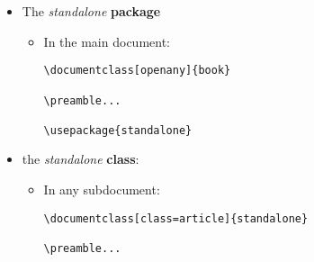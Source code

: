 \documentclass[class=article , crop=false, titlepage, twoside, multi={itemize, figure, verbatim}, float=false]{standalone}
\begin{document}
\begin{itemize}
\item The \emph{standalone} \textbf{package}

\begin{itemize}
\item In the main document:
\begin{verbatim}
\documentclass[openany]{book}

\preamble...

\usepackage{standalone}
\end{verbatim}

\end{itemize}

\item the \emph{standalone} \textbf{class}:  

\begin{itemize}
\item In any subdocument:
\begin{verbatim}
\documentclass[class=article]{standalone}

\preamble...
\end{verbatim}

\end{itemize}

\end{itemize} 
\end{document}
